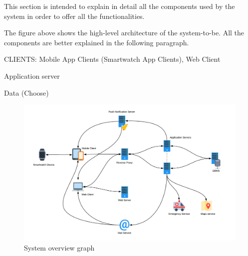 This section is intended to explain in detail all the components used by the system in order to offer all the functionalities.

The figure above shows the high-level architecture of the system-to-be. 
All the components are better explained in the following paragraph.

CLIENTS:
Mobile App Clients (Smartwatch App Clients), Web Client 

Application server

Data (Choose)

\begin{figure}[H]
	\includegraphics[width=\textwidth,height=\textheight,keepaspectratio]{assets/ArchitecturalDesignOverview.pdf}
	\caption{System overview graph}
	\label{fig:SOG}
\end{figure}
